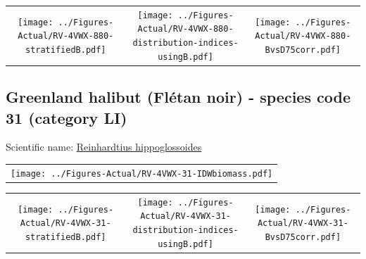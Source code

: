 \documentclass[12pt]{article}\usepackage[]{graphicx}\usepackage[]{color}
\begin{document}
\vspace{1cm}
\begin{minipage}{1.0\textwidth}
 \begin{tabular}{ccc}
\texttt{[image: ../Figures-Actual/RV-4VWX-880-stratifiedB.pdf]} & 
\texttt{[image: ../Figures-Actual/RV-4VWX-880-distribution-indices-usingB.pdf]} & 
\texttt{[image: ../Figures-Actual/RV-4VWX-880-BvsD75corr.pdf]} \\ 
\end{tabular} 
\end{minipage}
\clearpage

\renewcommand\thefigure{\thesubsection\Alph{figure}}

\setcounter{figure}{0}

\hypertarget{sec:31}{%
\subsection{Greenland halibut (Flétan noir) - species code 31 (category LI)}\label{sec:31}}

  


Scientific name: \href{http://www.marinespecies.org/aphia.php?p=taxdetails\&id=127144}{Reinhardtius hippoglossoides} \newline
\begin{minipage}{1.0\textwidth}
 \begin{tabular}{c}
\texttt{[image: ../Figures-Actual/RV-4VWX-31-IDWbiomass.pdf]} \\ 
\end{tabular} 
\end{minipage}
\newline

\vspace{1cm}
\begin{minipage}{1.0\textwidth}
 \begin{tabular}{ccc}
\texttt{[image: ../Figures-Actual/RV-4VWX-31-stratifiedB.pdf]} & 
\texttt{[image: ../Figures-Actual/RV-4VWX-31-distribution-indices-usingB.pdf]} & 
\texttt{[image: ../Figures-Actual/RV-4VWX-31-BvsD75corr.pdf]} \\ 
\end{tabular} 
\end{minipage}
\clearpage
\end{document}
